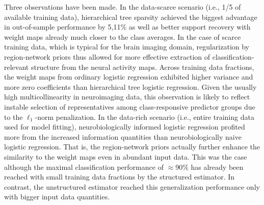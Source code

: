 \documentclass{article}
\begin{document}
Three observations have been made.
In the data-scarce scenario (i.e., 1/5 of available training data),
hierarchical tree sparsity achieved the biggest advantage
in out-of-sample performance by 5,11\% as well as
better support recovery with weight maps already much closer
to the class averages.
In the case of scarce training data, which is typical for the brain imaging domain,
regularization by region-network priors thus allowed for
more effective extraction of classification-relevant structure
from the neural activity maps.
%
Across training data fractions,
the weight maps from ordinary logistic regression exhibited
higher variance and more zero coefficients
than hierarchical tree logistic regression.
Given the usually high multicollinearity in neuroimaging data,
this observation is likely to reflect instable selection of
representatives among class-responsive predictor groups
due to the $\ell_1$-norm penalization.
%
In the data-rich scenario (i.e., entire training data used for model fitting),
neurobiologically informed logistic regression
profited more from the increased information quantities than
neurobiologically naive logistic regression.
That is, the region-network priors actually further enhance the similarity
to the weight maps even in abundant input data.
This was the case although
the maximal classification performance of $\approx$90\% has already
been reached with small training data fractions by the structured estimator.
In contrast, 
the unstructured estimator reached this generalization performance
only with bigger input data quantities.
\end{document}
